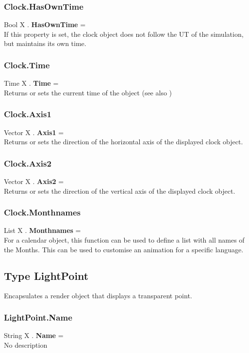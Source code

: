\subsubsection{Clock.HasOwnTime \label{F:Clock:HasOwnTime}}
Bool X . \textbf{HasOwnTime} = \\
If this property is set, the clock object does not follow the UT of the simulation, but maintains its own time.

\subsubsection{Clock.Time \label{F:Clock:Time}}
Time X . \textbf{Time} = \\
Returns or sets the current time of the object (see also )

\subsubsection{Clock.Axis1 \label{F:Clock:Axis1}}
Vector X . \textbf{Axis1} = \\
Returns or sets the direction of the horizontal axis of the displayed clock object.

\subsubsection{Clock.Axis2 \label{F:Clock:Axis2}}
Vector X . \textbf{Axis2} = \\
Returns or sets the direction of the vertical axis of the displayed clock object.

\subsubsection{Clock.Monthnames \label{F:Clock:Monthnames}}
List X . \textbf{Monthnames} = \\
For a calendar object, this function can be used to define a list with all names of the Months. This can be used to customise an animation for a specific language.

\subsection{Type LightPoint \label{T:LightPoint}}
Encapsulates a render object that displays a transparent point.

\subsubsection{LightPoint.Name \label{F:LightPoint:Name}}
String X . \textbf{Name} = \\
No description

